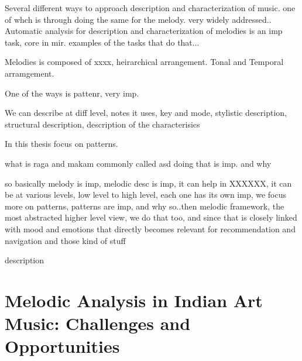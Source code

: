 Several different ways to approach description and characterization of music. one of whch is through doing the same for the melody. very widely addressed..
Automatic analysis for description and characterization of melodies is an imp task, core in mir. examples of the tasks that do that...

Melodies is composed of xxxx, heirarchical arrangement. Tonal and Temporal arramgement. 

One of the ways is pattenr, very imp. 

We can describe at diff level, notes it uses, key and mode, stylistic description, structural description, description of the characterisics

In this thesis focus on patterns. 

what is raga and makam commonly called asd doing that is imp. and why


so basically melody is imp, melodic desc is imp, it can help in XXXXXX, it can be at various levels, low level to high level, each one has its own imp, we focus more on patterns, patterns are imp, and why so..then melodic framework, the most abstracted higher level view, we do that too, and since that is closely linked with mood and emotions that directly becomes relevant for recommendation and navigation and those kind of stuff

description 
\section{Melodic Analysis in Indian Art Music: Challenges and Opportunities}
\label{sec:intro_challenges_oppurtunities}

%
%

